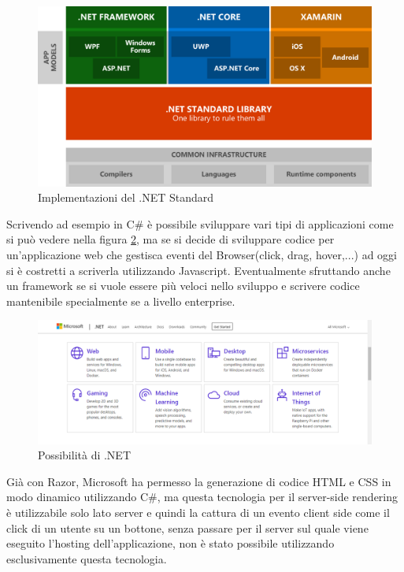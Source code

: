 \begin{figure}[H]
	\centerline{\includegraphics[scale=0.2]{figure/DotNetImplementations}}
	\caption{Implementazioni del .NET Standard}
	\label{fig:DotNetImplementations}
\end{figure}

Scrivendo ad esempio in C\# \`e possibile sviluppare vari tipi di applicazioni come si pu\`o vedere nella figura \ref{fig:DotNetCapabilities}, ma se si decide di sviluppare codice per un'applicazione web che gestisca eventi del Browser(click, drag, hover,...) ad oggi si \`e costretti a scriverla utilizzando Javascript.
Eventualmente sfruttando anche un framework se si vuole essere pi\`u veloci nello sviluppo e scrivere codice mantenibile specialmente se a livello enterprise.

\begin{figure}[H]
\centerline{\includegraphics[scale=0.35]{figure/DotNetFrameworkCapabilities}}
\caption{Possibilit\`a di .NET}
\label{fig:DotNetCapabilities}
\end{figure}

Gi\`a con Razor\cite{razor}, Microsoft ha permesso la generazione di codice HTML e CSS in modo dinamico utilizzando C\#, ma questa tecnologia per il server-side rendering \`e utilizzabile solo lato server e quindi la cattura di un evento client side come il click di un utente su un bottone, senza passare per il server sul quale viene eseguito l'hosting dell'applicazione, non \`e stato possibile utilizzando esclusivamente questa tecnologia.

